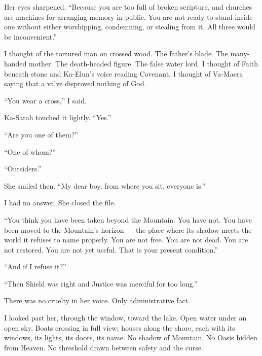 Her eyes sharpened. ``Because you are too full of broken scripture, and churches are machines for arranging memory in public. You are not ready to stand inside one without either worshipping, condemning, or stealing from it. All three would be inconvenient.''\par

I thought of the tortured man on crossed wood. The father's blade. The many-handed mother. The death-headed figure. The false water lord. I thought of Faith beneath stone and Ka-Elun's voice reading Covenant. I thought of Va-Maera saying that a valve disproved nothing of God.\par

``You wear a cross,'' I said.\par

Ka-Sarah touched it lightly. ``Yes.''\par

``Are you one of them?''\par

``One of whom?''\par

``Outsiders.''\par

She smiled then. ``My dear boy, from where you sit, everyone is.''\par

I had no answer. She closed the file.\par

``You think you have been taken beyond the Mountain. You have not. You have been moved to the Mountain's horizon --- the place where its shadow meets the world it refuses to name properly. You are not free. You are not dead. You are not restored. You are not yet useful. That is your present condition.''\par

``And if I refuse it?''\par

``Then Shield was right and Justice was merciful for too long.''\par

There was no cruelty in her voice. Only administrative fact.\par

I looked past her, through the window, toward the lake. Open water under an open sky. Boats crossing in full view; houses along the shore, each with its windows, its lights, its doors, its name. No shadow of Mountain. No Oasis hidden from Heaven. No threshold drawn between safety and the curse.\par

